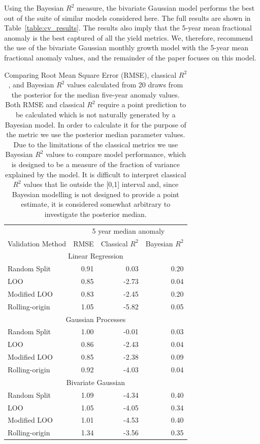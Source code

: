 \documentclass[12pt]{article}
\begin{document}
Using the Bayesian $R^2$ measure, the bivariate Gaussian model performs the best out of the suite of similar models considered here. The full results are shown in Table~\ref{table:cv_results}. The results also imply that the 5-year mean fractional anomaly is the best captured of all the yield metrics. We, therefore, recommend the use of the bivariate Gaussian monthly growth model with the 5-year mean fractional anomaly values, and the remainder of the paper focuses on this model.

\begin{table}
\small
\centering
\caption{Comparing Root Mean Square Error (RMSE), classical $R^2$, and Bayesian $R^2$ values calculated from 20 draws from the posterior for the median five-year anomaly values. Both RMSE and classical $R^2$ require a point prediction to be calculated which is not naturally generated by a Bayesian model. In order to calculate it for the purpose of the metric we use the posterior median parameter values. Due to the limitations of the classical metrics we use Bayesian $R^2$ values to compare model performance, which is designed to be a measure of the fraction of variance explained by the model. It is difficult to interpret classical $R^2$ values that lie outside the [0,1] interval and, since Bayesian modelling is not designed to provide a point estimate, it is considered somewhat arbitrary to investigate the posterior median.}
\label{table:cv_results_clas_bayes}
\vskip 0.15in
\begin{tabular}{lrrr}
\hline
 & \multicolumn{3}{c}{5 year median anomaly}  \\
Validation Method   & RMSE   & Classical $R^2$  & Bayesian $R^2$   \\ \hline

\multicolumn{4}{c}{Linear Regression}    \\ \hline
Random Split        & 0.91   & 0.03   &  0.20 \\
LOO                 & 0.85   & -2.73  &  0.04 \\
Modified LOO        & 0.83   & -2.45  &  0.20 \\
Rolling-origin      & 1.05   & -5.82  &  0.05 \\ \hline
\multicolumn{4}{c}{Gaussian Processes}   \\ \hline
Random Split        & 1.00   & -0.01  &  0.03 \\
LOO                 & 0.86   & -2.43  &  0.04 \\
Modified LOO        & 0.85   & -2.38  &  0.09 \\
Rolling-origin      & 0.92   & -4.03  &  0.04 \\ \hline
\multicolumn{4}{c}{Bivariate Gaussian}   \\ 
\hline
Random Split        & 1.09   & -4.34  &  0.40 \\
LOO                 & 1.05   & -4.05  &  0.34 \\
Modified LOO        & 1.01   & -4.53  &  0.40 \\
Rolling-origin      & 1.34   & -3.56  &  0.35 \\ \hline
\end{tabular}
\end{table}
\end{document}
